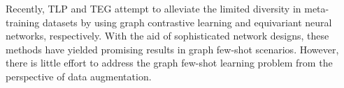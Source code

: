 Recently, TLP \cite{tan2022transductive} and TEG \cite{kim2023task} attempt to alleviate the limited diversity in meta-training datasets by using graph contrastive learning and equivariant neural networks, respectively. %
With the aid of sophisticated network designs, these methods have yielded promising results in graph few-shot scenarios. %
However, there is little effort to address the graph few-shot learning problem from the perspective of data augmentation.